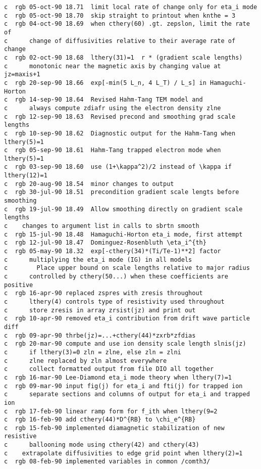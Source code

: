 \begin{verbatim}
c  rgb 05-oct-90 18.71  limit local rate of change only for eta_i mode
c  rgb 05-oct-90 18.70  skip straight to printout when knthe = 3
c  rgb 04-oct-90 18.69  when cthery(60) .gt. zepslon, limit the rate of
c      change of diffusivities relative to their average rate of change
c  rgb 02-oct-90 18.68  lthery(31)=1  r * (gradient scale lengths) 
c      monotonic near the magnetic axis by changing value at jz=maxis+1
c  rgb 20-sep-90 18.66  exp[-min(5 L_n, 4 L_T) / L_s] in Hamaguchi-Horton
c  rgb 14-sep-90 18.64  Revised Hahm-Tang TEM model and
c      always compute zdiafr using the electron density zlne
c  rgb 12-sep-90 18.63  Revised precond and smoothing grad scale lengths
c  rgb 10-sep-90 18.62  Diagnostic output for the Hahm-Tang when lthery(5)=1
c  rgb 05-sep-90 18.61  Hahm-Tang trapped electron mode when lthery(5)=1
c  rgb 03-sep-90 18.60  use (1+\kappa^2)/2 instead of \kappa if lthery(12)=1
c  rgb 20-aug-90 18.54  minor changes to output
c  rgb 30-jul-90 18.51  precondition gradient scale lengts before smoothing
c  rgb 19-jul-90 18.49  Allow smoothing directly on gradient scale lengths
c    changes to argument list in calls to sbrtn smooth
c  rgb 15-jul-90 18.48  Hamaguchi-Horton eta_i mode, first attempt
c  rgb 12-jul-90 18.47  Dominguez-Rosenbluth \eta_i^{th}
c  rgb 05-may-90 18.32  exp[-cthery(34)*(Ti/Te-1)**2] factor
c      multiplying the eta_i mode (IG) in all models
c        Place upper bound on scale lengths relative to major radius
c      controlled by cthery(50...) when these coefficients are positive
c  rgb 16-apr-90 replaced zspres with zresis throughout
c      lthery(4) controls type of resistivity used throughout
c      store zresis in array zrsist(jz) and print out
c  rgb 10-apr-90 removed eta_i contribution from drift wave particle diff
c  rgb 09-apr-90 thrbe(jz)=...+cthery(44)*zxrb*zfdias
c  rgb 20-mar-90 compute and use ion density scale length slnis(jz)
c      if lthery(3)=0 zln = zlne, else zln = zlni
c      zlne replaced by zln almost everywhere
c      collect formatted output from file DIO all together
c  rgb 16-mar-90 Lee-Diamond eta_i mode theory when lthery(7)=1
c  rgb 09-mar-90 input fig(j) for eta_i and fti(j) for trapped ion
c      separate sections and columns of output for eta_i and trapped ion
c  rgb 17-feb-90 linear ramp form for f_ith when lthery(9=2
c  rgb 16-feb-90 add cthery(44)*D^{RB} to \chi_e^{RB}
c  rgb 15-feb-90 implemented diamagnetic stabilization of new resistive
c      ballooning mode using cthery(42) and cthery(43)
c    extrapolate diffusivities to edge grid point when lthery(2)=1
c  rgb 08-feb-90 implemented variables in common /comth3/

\end{verbatim}
